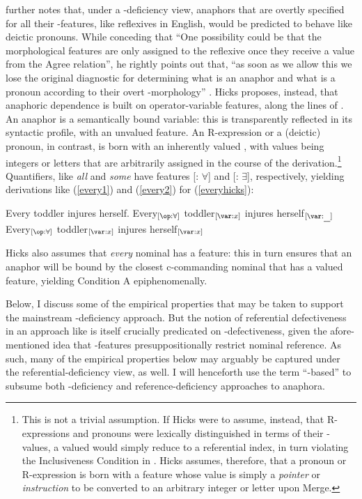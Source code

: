 \documentclass[output=paper, modfonts, nonflat]{langsci/langscibook}
\begin{document}
\noindent \citet{Hicks:2009} further notes that, under a \ph-deficiency view,
anaphors that are overtly specified for all their \ph-features, like
reflexives in English, would be predicted to behave like deictic
pronouns. While conceding that ``One possibility could be that the
morphological features are only assigned to the reﬂexive once they
receive a value from the Agree relation'', he rightly points out that,
``as soon as we allow this we lose the original diagnostic for
determining what is an anaphor and what is a pronoun according to
their overt \ph-morphology'' \citep[111]{Hicks:2009}.  Hicks
proposes, instead, that anaphoric dependence is built on
operator-variable features, along the lines of
\citet{adgerramchand:2005}. An anaphor is a semantically bound
variable: this is transparently reflected in its syntactic profile,
with an unvalued \var{} feature. An R-expression or a (deictic)
pronoun, in contrast, is born with an inherently valued \var, with
values being integers or letters that are arbitrarily assigned in the
course of the derivation.{\footnote{This is not a trivial
  assumption. If Hicks were to assume, instead, that R-expressions and
  pronouns were lexically distinguished in terms of their \var-values,
  a valued \var{} would simply reduce to a referential index, in turn
  violating the Inclusiveness Condition in \citet[][381]{chomsky:1995}. Hicks assumes, therefore, that a pronoun or R-expression is
  born with a feature whose value is simply a \emph{pointer} or
  \emph{instruction} to be converted to an arbitrary integer or letter
  upon Merge.}}  Quantifiers, like \textit{all} and \textit{some} have \op{} features
[\op: $\forall$] and [\op: $\exists$], respectively, yielding
derivations like (\ref{every1}) and (\ref{every2}) for
(\ref{everyhicks}):

\ea\label{everyhicks} Every toddler injures herself.
\ea\label{every1} Every$_{[\op:\forall]}$ toddler$_{[\var:x]}$ injures
herself$_{[\var:\ul{~~}]}$
\ex\label{every2} Every$_{[\op:\forall]}$ toddler$_{[\var:x]}$ injures
herself$_{[\var:x]}$ \z \z

\noindent Hicks also assumes that \emph{every} nominal has a \var{} feature:
this in turn ensures that an anaphor will be bound by the closest
c-commanding nominal that has a valued \var{} feature, yielding
Condition A epiphenomenally.
  
Below, I discuss some of the empirical properties that may be taken to
support the mainstream \ph-deficiency approach. But the notion of
referential defectiveness in an approach like \citet{Hicks:2009} is
itself crucially predicated on \ph-defectiveness, given the
afore-mentioned idea that \ph-features presuppositionally restrict
nominal reference. As such, many of the empirical properties below may
arguably be captured under the referential-deficiency view, as well. I
will henceforth use the term ``\ph-based'' to subsume both
\ph-deficiency and reference-deficiency approaches to anaphora.
\end{document}
